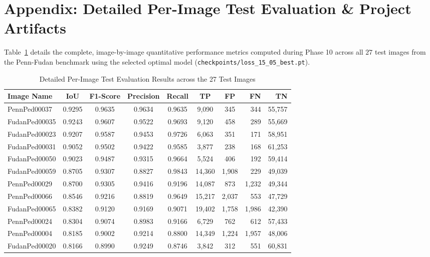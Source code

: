 \documentclass[10pt,a4paper]{report}
\begin{document}
\clearpage
\chapter*{Appendix: Detailed Per-Image Test Evaluation \& Project Artifacts}
\label{chap:appendix}

Table~\ref{tab:appendix_per_image} details the complete, image-by-image quantitative performance metrics computed during Phase 10 across all $27$ test images from the Penn-Fudan benchmark using the selected optimal model (\texttt{checkpoints/loss\_15\_05\_best.pt}).

\begin{table}[htbp]
\centering
\scriptsize
\renewcommand{\arraystretch}{0.86}
\caption{Detailed Per-Image Test Evaluation Results across the 27 Test Images}
\label{tab:appendix_per_image}
\begin{tabular}{lccccccrr}
\toprule
\textbf{Image Name} & \textbf{IoU} & \textbf{F1-Score} & \textbf{Precision} & \textbf{Recall} & \textbf{TP} & \textbf{FP} & \textbf{FN} & \textbf{TN} \\
\midrule
PennPed00037 & 0.9295 & 0.9635 & 0.9634 & 0.9635 & 9,090 & 345 & 344 & 55,757 \\
FudanPed00035 & 0.9243 & 0.9607 & 0.9522 & 0.9693 & 9,120 & 458 & 289 & 55,669 \\
FudanPed00023 & 0.9207 & 0.9587 & 0.9453 & 0.9726 & 6,063 & 351 & 171 & 58,951 \\
FudanPed00031 & 0.9052 & 0.9502 & 0.9422 & 0.9585 & 3,877 & 238 & 168 & 61,253 \\
FudanPed00050 & 0.9023 & 0.9487 & 0.9315 & 0.9664 & 5,524 & 406 & 192 & 59,414 \\
FudanPed00059 & 0.8705 & 0.9307 & 0.8827 & 0.9843 & 14,360 & 1,908 & 229 & 49,039 \\
PennPed00029 & 0.8700 & 0.9305 & 0.9416 & 0.9196 & 14,087 & 873 & 1,232 & 49,344 \\
PennPed00066 & 0.8546 & 0.9216 & 0.8819 & 0.9649 & 15,217 & 2,037 & 553 & 47,729 \\
FudanPed00065 & 0.8382 & 0.9120 & 0.9169 & 0.9071 & 19,402 & 1,758 & 1,986 & 42,390 \\
PennPed00024 & 0.8304 & 0.9074 & 0.8983 & 0.9166 & 6,729 & 762 & 612 & 57,433 \\
PennPed00004 & 0.8185 & 0.9002 & 0.9214 & 0.8800 & 14,349 & 1,224 & 1,957 & 48,006 \\
FudanPed00020 & 0.8166 & 0.8990 & 0.9249 & 0.8746 & 3,842 & 312 & 551 & 60,831 \\

\end{tabular}
\end{table}
\end{document}
